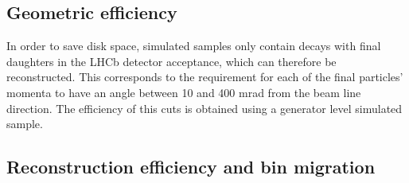 


\subsection{Geometric efficiency}


In order to save disk space, simulated samples only contain decays with final daughters
in the LHCb detector acceptance, which can therefore be reconstructed. 
This corresponds to the requirement for each of the final particles' momenta
to have an angle between 10 and 400 mrad from the beam line direction. The efficiency of this
cuts is obtained using a generator level simulated sample.

\subsection{Reconstruction efficiency and bin migration}
\label{sec:reco_binmig}

